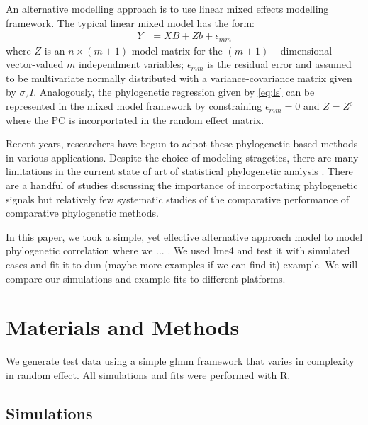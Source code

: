 \documentclass[12pt]{article}
\begin{document}
An alternative modelling approach is to use linear mixed effects modelling framework.
The typical linear mixed model has the form:
\begin{align}
Y & = XB + Zb + \epsilon_{mm}
\end{align}
where $Z$ is an $n \times (m+1)$ model matrix for the $(m+1)$ -- dimensional vector-valued $m$ independment variables; $\epsilon_{mm}$ is the residual error and assumed to be multivariate normally distributed with a variance-covariance matrix given by $\sigma_{2}I$.
Analogously, the phylogenetic regression given by \ref{eq:ls} can be represented in the mixed model framework by constraining $\epsilon_{mm} = 0$ and $Z=Z^{c}$ where the PC is incorportated in the random effect matrix.

Recent years, researchers have begun to adpot these phylogenetic-based methods in various applications. 
Despite the choice of modeling strageties, there are many limitations in the current state of art of statistical phylogenetic analysis .
There are a handful of studies discussing the importance of incorportating phylogenetic signals but relatively few systematic studies of the comparative performance of comparative phylogenetic methods. 

In this paper, we took a simple, yet effective alternative approach model to model phylogenetic correlation where we ... . We used lme4 and test it with simulated cases and fit it to dun (maybe more examples if we can find it) example. 
We will compare our simulations and example fits to different platforms. 

\section{Materials and Methods}

We generate test data using a simple glmm framework that varies in complexity in random effect. All simulations and fits were performed with R. 

\subsection{Simulations}
\end{document}
